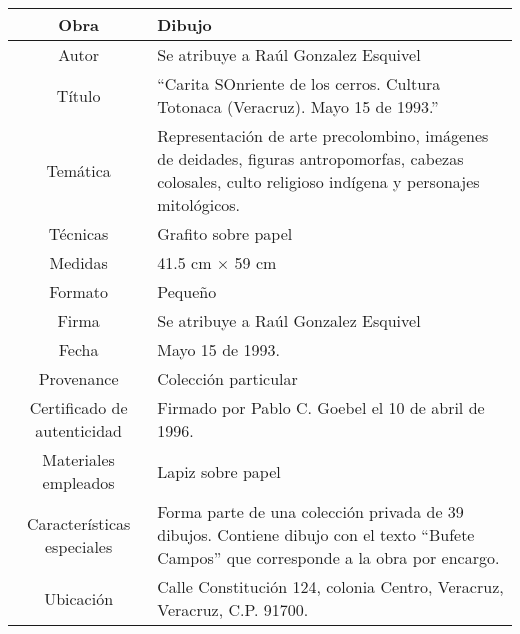 \begin{table}[H]
\centering
\begin{tabular}{|c|m{}|}
\hline
Obra& Dibujo	\\
\hline
Autor & Se atribuye a Ra\'ul Gonzalez Esquivel\\
\hline
T\'itulo &``Carita SOnriente de los cerros. Cultura Totonaca (Veracruz). Mayo 15 de 1993.'' \\
\hline
Tem\'atica & Representaci\'on de arte precolombino, im\'agenes de deidades, figuras antropomorfas, cabezas colosales, culto religioso ind\'igena y personajes mitol\'ogicos.\\
\hline
T\'ecnicas &Grafito sobre papel \\
\hline
Medidas & 41.5 cm $\times$ 59 cm \\
\hline
 Formato & Peque\~no \\
 \hline
 Firma & Se atribuye a Ra\'ul Gonzalez Esquivel\\ 
 \hline
  Fecha & Mayo 15 de 1993.\\
 \hline
 Provenance & Colecci\'on particular\\
 \hline
 Certificado de autenticidad& Firmado por Pablo C. Goebel el 10 de abril de 1996.  \\
 \hline 
  Materiales empleados & Lapiz sobre papel\\
 \hline
 Caracter\'isticas especiales & Forma parte de una colecci\'on privada de 39 dibujos. 
Contiene dibujo con el texto ``Bufete Campos'' que corresponde a la obra por encargo. \\
\hline 
Ubicaci\'on & Calle Constituci\'on 124, colonia Centro, Veracruz, Veracruz, C.P. 91700.\\
\hline

\end{tabular}
\end{table}

